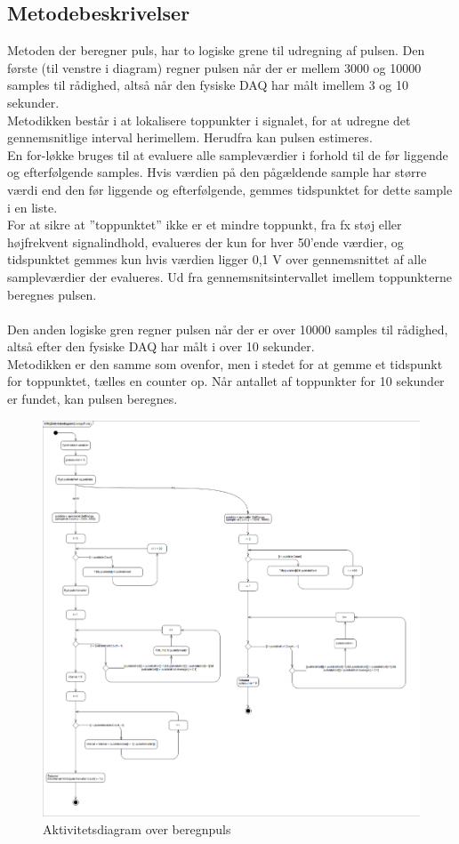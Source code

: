 \subsection{Metodebeskrivelser}
Metoden der beregner puls, har to logiske grene til udregning af pulsen. Den første (til venstre i diagram) regner pulsen når der er mellem 3000 og 10000 samples til rådighed, altså når den fysiske DAQ har målt imellem 3 og 10 sekunder.\\
Metodikken består i at lokalisere toppunkter i signalet, for at udregne det gennemsnitlige interval herimellem. Herudfra kan pulsen estimeres. \\
En for-løkke bruges til at evaluere alle sampleværdier i forhold til de før liggende og efterfølgende samples. Hvis værdien på den pågældende sample har større værdi end den før liggende og efterfølgende, gemmes tidspunktet for dette sample i en liste.\\ 
For at sikre at ”toppunktet” ikke er et mindre toppunkt, fra fx støj eller højfrekvent signalindhold, evalueres der kun for hver 50'ende værdier, og tidspunktet gemmes kun hvis værdien ligger 0,1 V over gennemsnittet af alle sampleværdier der evalueres. Ud fra gennemsnitsintervallet imellem toppunkterne beregnes pulsen.
\\
\\
Den anden logiske gren regner pulsen når der er over 10000 samples til rådighed, altså efter den fysiske DAQ har målt i over 10 sekunder.\\ 
Metodikken er den samme som ovenfor, men i stedet for at gemme et tidspunkt for toppunktet, tælles en counter op. Når antallet af toppunkter for 10 sekunder er fundet, kan pulsen beregnes.

\begin{figure}[H]
	\centering
	\includegraphics[width=1\textwidth]{Figurer/aktivitetsdiagram_beregnPuls}
	\caption{Aktivitetsdiagram over beregnpuls}
\end{figure}


